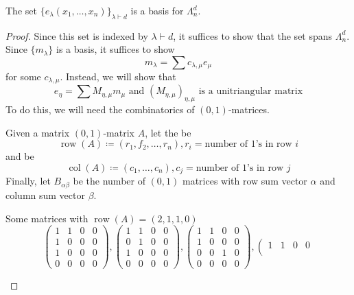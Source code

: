 \documentclass[11pt,leqno,oneside]{amsart}
\numberwithin{thm}{section}
\newcommand{\row}{\operatorname{row}}
\newcommand{\col}{\operatorname{col}}
\newcommand{\defeq}{\coloneqq}
\newcommand{\partitionof}{\vdash}
\newcommand{\sym}{\Lambda}
\begin{document}
\begin{prop}
  The set \(\{e_\lambda(x_1, \ldots, x_n)\}_{\lambda \partitionof d}\)
  is a basis for \(\sym_n^d\).
\end{prop}
\begin{proof}
  Since this set is indexed by \(\lambda \partitionof d\), it suffices
  to show that the set spans \(\sym_n^d\). Since \(\{m_\lambda\}\) is
  a basis, it suffices to show \[
    m_\lambda = \sum c_{\lambda,\mu} e_\mu
  \]
  for some \(c_{\lambda,\mu}\). Instead, we will show that \[
    e_\eta = \sum M_{\eta,\mu} m_\mu \text{ and }
    (M_{\eta,\mu})_{\eta,\mu} \text{ is a unitriangular matrix}
  \]
  To do this, we will need the combinatorics of \((0,1)\)-matrices.
  \begin{defn}
    Given a matrix \((0,1)\)-matrix \(A\), let the  be \[
      \row(A) \defeq (r_1, f_2, \ldots, r_n), r_i = \text{number of
        1's in row }i 
    \]
    and  be \[
      \col(A) \defeq (c_1, \ldots, c_n), c_j = \text{number of 1's in
        row }j
    \]
    Finally, let \(B_{\alpha \beta}\) be the number of \((0,1)\)
    matrices with row sum vector \(\alpha\) and column sum vector
    \(\beta\). 
  \end{defn}
  \begin{example}
    Some matrices with \(\row(A) = (2,1,1,0)\) \[
      \left(
        \begin{array}{cccc}
          1&1&0&0\\
          1&0&0&0\\
          1&0&0&0\\
          0&0&0&0
        \end{array}
      \right),
            \left(
        \begin{array}{cccc}
          1&1&0&0\\
          0&1&0&0\\
          1&0&0&0\\
          0&0&0&0
        \end{array}
      \right),
      \left(
        \begin{array}{cccc}
          1&1&0&0\\
          1&0&0&0\\
          0&0&1&0\\
          0&0&0&0
        \end{array}
      \right),
            \left(
        \begin{array}{cccc}
          1&1&0&0\\

\end{array}\]
\end{example}
\end{proof}
\end{document}
